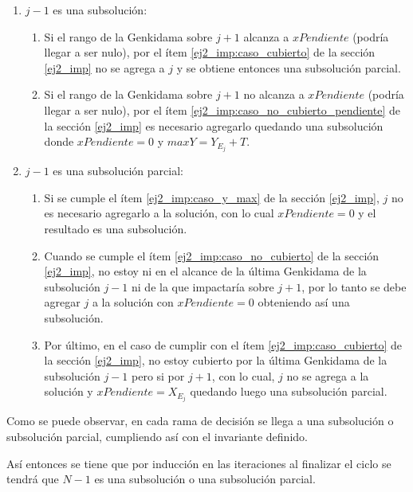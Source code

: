 \begin{enumerate}
{			\begin{enumerate}
				\item{
					$j - 1$ es una subsolución:
					\begin{enumerate}
						\item{
							Si el rango de la Genkidama sobre $j + 1$ alcanza a
							$xPendiente$ (podría llegar a ser nulo), por el ítem
							\ref{ej2_imp:caso_cubierto} de la sección \ref{ej2_imp}
							no se agrega a $j$ y se obtiene entonces una subsolución
							parcial.
						}
						\item{
							Si el rango de la Genkidama sobre $j + 1$ no alcanza a
							$xPendiente$ (podría llegar a ser nulo), por el ítem
							\ref{ej2_imp:caso_no_cubierto_pendiente} de la
							sección \ref{ej2_imp} es necesario agregarlo
							quedando una subsolución donde $xPendiente = 0$ y
							$maxY = Y_{E_j} + T$.
						}
					\end{enumerate}
					}
				\item{
					$j - 1$ es una subsolución parcial:
					\begin{enumerate}
						\item{
							Si se cumple el ítem \ref{ej2_imp:caso_y_max} de la
							sección \ref{ej2_imp}, $j$ no es necesario agregarlo
							a la solución, con lo cual $xPendiente = 0$ y
							el resultado es una subsolución.
						}
						\item{
							Cuando se cumple el ítem
							\ref{ej2_imp:caso_no_cubierto} de la sección
							\ref{ej2_imp}, no estoy ni en el alcance de la
							última Genkidama de la subsolución $j - 1$ ni
							de la que impactaría sobre $j + 1$, por lo tanto se
							debe agregar $j$ a la solución con $xPendiente = 0$
							obteniendo así una subsolución.
						}
						\item{
							Por último, en el caso de cumplir con el ítem
							\ref{ej2_imp:caso_cubierto} de la sección
							\ref{ej2_imp}, no estoy cubierto por la última
							Genkidama de la subsolución $j - 1$ pero si
							por $j + 1$, con lo cual, $j$ no se agrega a la
							solución y $xPendiente = X_{E_j}$ quedando luego
							una subsolución parcial.
						}
					\end{enumerate}
				}
			\end{enumerate}

			Como se puede observar, en cada rama de decisión se llega a una
			subsolución o subsolución parcial, cumpliendo así con el invariante
			definido.

			Así entonces se tiene que por inducción en las iteraciones al
			finalizar el ciclo se tendrá que $N - 1$ es una subsolución o una
			subsolución parcial.

}
\end{enumerate}
